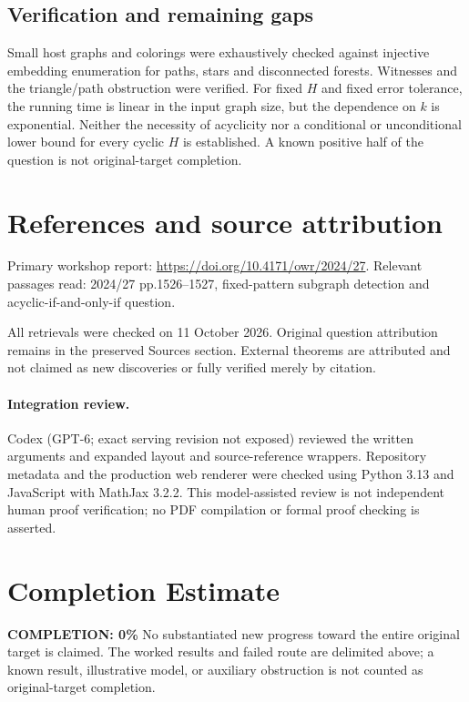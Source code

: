 \documentclass[11pt]{article}
\begin{document}
\subsection{Verification and remaining gaps}
Small host graphs and colorings were exhaustively checked against injective embedding enumeration for paths, stars and disconnected forests. Witnesses and the triangle/path obstruction were verified. For fixed $H$ and fixed error tolerance, the running time is linear in the input graph size, but the dependence on $k$ is exponential. Neither the necessity of acyclicity nor a conditional or unconditional lower bound for every cyclic $H$ is established. A known positive half of the question is not original-target completion.

\section{References and source attribution}
Primary workshop report: \url{https://doi.org/10.4171/owr/2024/27}. Relevant passages read: 2024/27 pp.1526--1527, fixed-pattern subgraph detection and acyclic-if-and-only-if question.

All retrievals were checked on 11 October 2026. Original question attribution remains in the preserved Sources section. External theorems are attributed and not claimed as new discoveries or fully verified merely by citation.


\paragraph{Integration review.} Codex (GPT-6; exact serving revision not exposed) reviewed the written arguments and expanded layout and source-reference wrappers. Repository metadata and the production web renderer were checked using Python 3.13 and JavaScript with MathJax 3.2.2. This model-assisted review is not independent human proof verification; no PDF compilation or formal proof checking is asserted.

\section{Completion Estimate}
\noindent\textbf{COMPLETION: 0\%}
No substantiated new progress toward the entire original target is claimed. The worked results and failed route are delimited above; a known result, illustrative model, or auxiliary obstruction is not counted as original-target completion.
\end{document}
